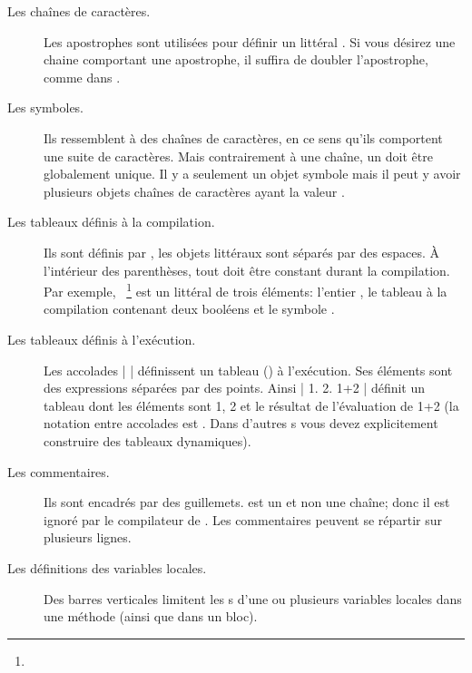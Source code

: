 \documentclass[a4paper,10pt,twoside]{book}
\begin{document}
\begin{description}
\item[Les chaînes de caractères.] Les apostrophes sont utilisées pour définir un  littéral .
Si vous désirez une chaine comportant une apostrophe, il suffira de doubler l'apostrophe, comme dans .

\item[Les symboles.] Ils ressemblent à des chaînes de caractères, en ce sens qu'ils comportent une suite de caractères.  
Mais contrairement à une chaîne, un  doit être globalement unique.
Il y a seulement un objet symbole  mais il peut y avoir plusieurs objets chaînes de caractères ayant la valeur .

\item[Les tableaux définis à la compilation.] Ils sont définis par \ct{#( )}, les objets littéraux 
sont séparés par des espaces.
À l'intérieur des parenthèses, tout doit être constant durant la compilation.
Par exemple,  ~\footnote{} est un
 littéral de trois éléments: l'entier , le tableau à la compilation contenant deux booléens et le symbole .

\item[Les tableaux définis à l'exécution.] Les accolades \ct|{ }|
  définissent un tableau () à l'exécution.
Ses éléments sont des expressions séparées par des points.
Ainsi \ct|{ 1. 2. 1+2 }| définit un tableau dont les éléments sont 1, 2 et le résultat de l'évaluation de 1+2
(la notation entre accolades est . %
Dans d'autres \st{}s vous devez explicitement construire des tableaux dynamiques).

\item[Les commentaires.] Ils sont encadrés par des guillemets.
 est un  et non une
chaîne; donc il est ignoré par le compilateur de \pharo.
Les commentaires peuvent se répartir sur plusieurs lignes.
		
\item[Les définitions des variables locales.] Des barres
  verticales \ct{| |} limitent les
  s d'une ou plusieurs variables
  locales dans une méthode (ainsi que dans un bloc).


\end{description}
\end{document}
